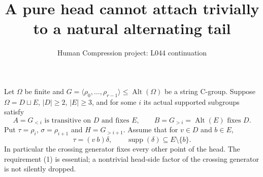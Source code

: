 \documentclass[11pt,a4paper]{article}
\title{A pure head cannot attach trivially to a natural alternating tail}
\author{Human Compression project: L044 continuation}
\date{}
\newcommand{\gen}[1]{\langle#1\rangle}
\newcommand{\Alt}{\operatorname{Alt}}
\begin{document}
\maketitle
Let $\Omega$ be finite and $G=\gen{\rho_0,\ldots,\rho_{r-1}}\le\Alt(\Omega)$ be a
string C-group. Suppose $\Omega=D\sqcup E$, $|D|\ge2$, $|E|\ge3$,
and for some $i$ its actual supported subgroups satisfy
\[
 A=G_{<i}\text{ is transitive on }D\text{ and fixes }E,
 \qquad B=G_{>i}=\Alt(E)\text{ fixes }D.
\]
Put $\tau=\rho_i$, $\sigma=\rho_{i+1}$ and $H=G_{>i+1}$.
Assume that for $v\in D$ and $b\in E$,
\[
          \tau=(v\ b)\delta,\qquad
          \operatorname{supp}(\delta)\subseteq E\setminus\{b\}.
                                                               \tag{1}
\]
In particular the crossing generator fixes every other point of the
head. The requirement (1) is essential; a nontrivial head-side factor
of the crossing generator is not silently dropped.
\end{document}
